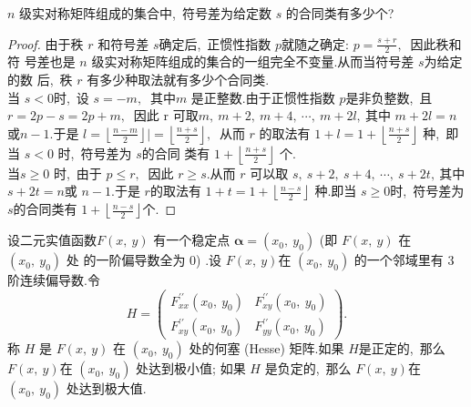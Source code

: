 \newpage
\begin{problem}
	$n$  级实对称矩阵组成的集合中,\  符号差为给定数 $ s $ 的合同类有多少个?
\end{problem}
\begin{proof}
	由于秩  $r$  和符号差  $s  $确定后,\  正惯性指数 $ p  $就随之确定:  $p=\frac{s+r}{2} ,\ $ 因此秩和符 号差也是 $ n $ 级实对称矩阵组成的集合的一组完全不变量.从而当符号差 $ s  $为给定的数 后,\  秩  $r$  有多少种取法就有多少个合同类.\\
	当 $ s<0  $时,\  设 $ s=-m ,\ $ 其中$  m $ 是正整数.由于正惯性指数  $p  $是非负整数,\  且 $ r=   2 p-s=2 p+m ,\ $ 因此  r  可取$  m,\  m+2,\  m+4,\  \cdots,\  m+2 l ,\  $其中 $ m+2 l=n $ 或$  n-1  .$于是 $ l=   \left\lfloor\frac{n-m}{2}\right\rfloor \mid=\left\lfloor\frac{n+s}{2}\right\rfloor ,\ $ 从而  $r$  的取法有  $1+l=1+\left\lfloor\frac{n+s}{2}\right\rfloor$  种,\  即当  $s<0$  时,\  符号差为  $s  $的合同 类有 $ 1+\left\lfloor\frac{n+s}{2}\right\rfloor$  个.\\
	当$  s \geqslant 0 $ 时,\  由于 $p \leqslant r ,\ $ 因此  $r \geqslant s  .$从而  $r$  可以取  $s,\  s+2,\  s+4,\  \cdots,\  s+2 t ,\  $其中 $ s+2 t=n  $或  $n-1  .$于是  $r  $的取法有  $1+t=1+\left\lfloor\frac{n-s}{2}\right\rfloor$  种.即当 $ s \geqslant 0  $时,\  符号差为  $s  $的合同类有 $ 1+   \left\lfloor\frac{n-s}{2}\right\rfloor  $个.
\end{proof}
\newpage
\begin{problem}
	设二元实值函数$ F(x,\  y) $ 有一个稳定点  $\boldsymbol{\alpha}=\left(x_{0},\  y_{0}\right)$  (即 $ F(x,\  y) $ 在  $\left(x_{0},\  y_{0}\right) $ 处 的一阶偏导数全为 $0 $)  .设 $ F(x,\  y)  $在  $\left(x_{0},\  y_{0}\right) $ 的一个邻域里有 $3$ 阶连续偏导数.令
	$$H=\left(\begin{array}{ll}
		F_{x x}^{\prime \prime}\left(x_{0},\  y_{0}\right) & F_{x y}^{\prime \prime}\left(x_{0},\  y_{0}\right) \\
		F_{x y}^{\prime \prime}\left(x_{0},\  y_{0}\right) & F_{y y}^{\prime \prime}\left(x_{0},\  y_{0}\right)
	\end{array}\right) .$$
	称 $ H$  是 $ F(x,\  y) $ 在  $\left(x_{0},\  y_{0}\right)$  处的何塞 (Hesse) 矩阵.如果 $ H  $是正定的,\  那么 $ F(x,\  y)  $在  $\left(x_{0},\  y_{0}\right)$  处达到极小值; 如果 $ H$  是负定的,\  那么 $ F(x,\  y) $在  $\left(x_{0},\  y_{0}\right) $ 处达到极大值.
\end{problem}
